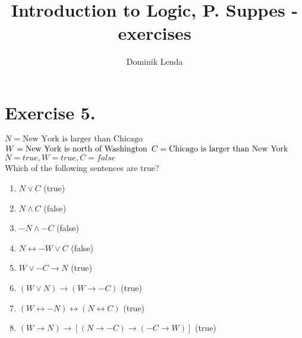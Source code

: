 \documentclass{article}
\title{Introduction to Logic, P. Suppes - exercises}
\author{Dominik Lenda}
\begin{document}
\maketitle
\section*{Exercise 5.}

$N = \text{New York is larger than Chicago}$\\
$W = \text{New York is north of Washington}\\$
$C = \text{Chicago is larger than New York}\\$
$N = true, W = true, C = false$
\\
Which of the following sentences are true?

\begin{enumerate}[label=(\alph*)]
\item $N \vee C$ (true)
\item $N \wedge C$ (false)
\item $-N \wedge -C$ (false)
\item $N \leftrightarrow -W \vee C$ (false)
\item $W \vee -C \rightarrow N$ (true)
\item $(W \vee N) \rightarrow (W \rightarrow -C)$ (true)
\item $(W \leftrightarrow -N) \leftrightarrow (N \leftrightarrow C)$ (true)
\item $(W \rightarrow N) \rightarrow [(N \rightarrow -C) \rightarrow (-C \rightarrow W)]$ (true)
\end{enumerate}
\end{document}
